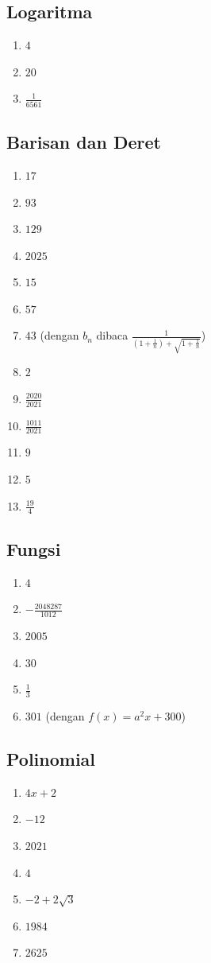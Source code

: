 \documentclass[12pt]{scrartcl}
\begin{document}
\subsection{Logaritma}
\begin{enumerate}
\item $4$
\item $20$
\item $\frac{1}{6561}$
\end{enumerate}
\subsection{Barisan dan Deret}
\begin{enumerate}
\item $17$
\item $93$
\item $129$
\item $2025$
\item $15$
\item $57$
\item $43$ (dengan $b_n$ dibaca $\frac{1}{(1+\frac1n)+\sqrt{1+\frac1n}}$)
\item $2$
\item $\frac{2020}{2021}$
\item $\frac{1011}{2021}$
\item $9$
\item $5$
\item $\frac{19}{4}$
\end{enumerate}
\subsection{Fungsi}
\begin{enumerate}
\item $4$
\item $-\frac{2048287}{1012}$
\item $2005$
\item $30$
\item $\frac{1}{3}$
\item $301$ (dengan $f(x)=a^2x+300$)
\end{enumerate}
\subsection{Polinomial}
\begin{enumerate}
\item $4x+2$
\item $-12$
\item $2021$
\item $4$
\item $-2+2\sqrt{3}$
\item $1984$
\item $2625$
\end{enumerate}
\end{document}
